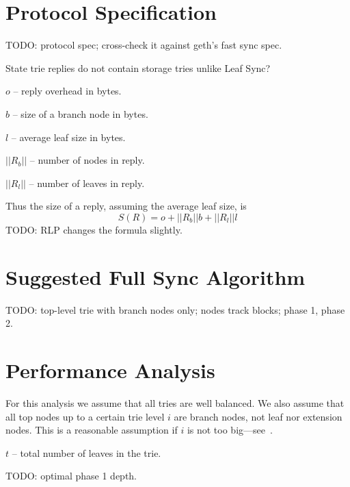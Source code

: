 \documentclass{amsart}
\begin{document}
\section{Protocol Specification}
TODO: protocol spec; cross-check it against geth's fast sync spec.

State trie replies do not contain storage tries unlike Leaf Sync? 


$o$ -- reply overhead in bytes.

$b$ -- size of a branch node in bytes.

$l$ -- average leaf size in bytes.

$||R_b||$ -- number of nodes in reply.

$||R_l||$ -- number of leaves in reply.

Thus the size of a reply, assuming the average leaf size, is
\begin{equation}
    S(R) = o + ||R_b|| b + ||R_l|| l
\end{equation}
TODO: RLP changes the formula slightly.

\section{Suggested Full Sync Algorithm}
TODO: top-level trie with branch nodes only; nodes track blocks; phase 1, phase 2.

\section{Performance Analysis}
For this analysis we assume that all tries are well balanced.
We also assume that all top nodes up to a certain trie level $i$ are branch nodes, not leaf nor extension nodes.
This is a reasonable assumption if $i$ is not too big---see~\cite{akhunov_1x_workshop_part2}.

$t$ -- total number of leaves in the trie.

TODO: optimal phase 1 depth.
\end{document}
